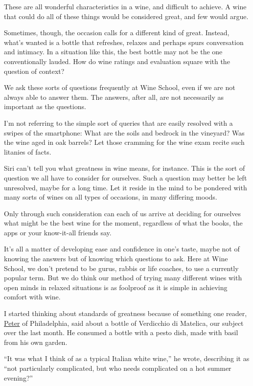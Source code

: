 These are all wonderful characteristics in a wine, and difficult to
achieve. A wine that could do all of these things would be considered
great, and few would argue.

Sometimes, though, the occasion calls for a different kind of great.
Instead, what's wanted is a bottle that refreshes, relaxes and perhaps
spurs conversation and intimacy. In a situation like this, the best
bottle may not be the one conventionally lauded. How do wine ratings and
evaluation square with the question of context?

We ask these sorts of questions frequently at Wine School, even if we
are not always able to answer them. The answers, after all, are not
necessarily as important as the questions.

I'm not referring to the simple sort of queries that are easily resolved
with a swipes of the smartphone: What are the soils and bedrock in the
vineyard? Was the wine aged in oak barrels? Let those cramming for the
wine exam recite such litanies of facts.

Siri can't tell you what greatness in wine means, for instance. This is
the sort of question we all have to consider for ourselves. Such a
question may better be left unresolved, maybe for a long time. Let it
reside in the mind to be pondered with many sorts of wines on all types
of occasions, in many differing moods.

Only through such consideration can each of us arrive at deciding for
ourselves what might be the best wine for the moment, regardless of what
the books, the apps or your know-it-all friends say.

It's all a matter of developing ease and confidence in one's taste,
maybe not of knowing the answers but of knowing which questions to ask.
Here at Wine School, we don't pretend to be gurus, rabbis or life
coaches, to use a currently popular term. But we do think our method of
trying many different wines with open minds in relaxed situations is as
foolproof as it is simple in achieving comfort with wine.

I started thinking about standards of greatness because of something one
reader,
\href{https://www.nytimes.com/2020/07/02/dining/drinks/wine-school-assignment-verdicchio-di-matelica.html\#commentsContainer\&permid=108235588}{Peter}
of Philadelphia, said about a bottle of Verdicchio di Matelica, our
subject over the last month. He consumed a bottle with a pesto dish,
made with basil from his own garden.

``It was what I think of as a typical Italian white wine,'' he wrote,
describing it as ``not particularly complicated, but who needs
complicated on a hot summer evening?''

